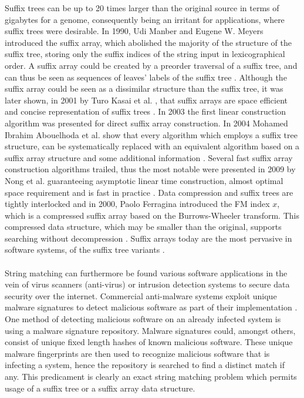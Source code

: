 \documentclass[12pt]{article} %
\begin{document}
Suffix trees can be up to 20 times larger than the original source in terms of gigabytes for a genome, consequently being an irritant for applications, where suffix trees were desirable.  In 1990, Udi Manber and Eugene W. Meyers introduced the suffix array, which abolished the majority of the structure of the suffix tree, storing only the suffix indices of the string input in lexicographical order. A suffix array could be created by a preorder traversal of a suffix tree, and can thus be seen as sequences of leaves’ labels of the suffix tree \cite{ apostolico201640}. Although the suffix array could be seen as a dissimilar structure than the suffix tree, it was later shown, in 2001 by Turo Kasai et al. \cite{ apostolico201640}, that suffix arrays are space efficient and concise representation of suffix trees  \cite{ apostolico201640, gusfield}. In 2003 the first linear construction algorithm was presented for direct suffix array construction. In 2004 Mohamed Ibrahim Abouelhoda et al. \cite{enchancedsuffix} show that every algorithm which employs a suffix tree structure, can be systematically replaced with an equivalent algorithm based on a suffix array structure and some additional information \cite{enchancedsuffix}. Several fast suffix array construction algorithms trailed, thus the most notable were presented in 2009 by Nong et al. guaranteeing asymptotic linear time construction, almost optimal space requirement and is fast in practice \cite{newapproach, twoeffecient, apostolico201640}. Data compression and suffix trees are tightly interlocked and in 2000, Paolo Ferragina introduced the FM index $x$, which is a compressed suffix array based on the Burrows-Wheeler transform. This compressed data structure, which may be smaller than the original, supports searching without decompression \cite{apostolico201640}. Suffix arrays today are the most pervasive in software systems, of the suffix tree variants \cite{apostolico201640}.  \\ \\
String matching can furthermore be found various software applications in the vein of virus scanners (anti-virus) or intrusion detection systems to secure data security over the internet. Commercial anti-malware systems exploit unique malware signatures to detect malicious software as part of their implementation \cite{kruegel2003using, detection}. One method of detecting malicious software on an already infected system is using a malware signature repository.  Malware signatures could, amongst others, consist of unique fixed length hashes of known malicious software. These unique malware fingerprints are then used to recognize malicious software that is infecting a system, hence the repository is searched to find a distinct match if any. This predicament is clearly an exact string matching problem which permits usage of a suffix tree or a suffix array data structure. 
\end{document}
